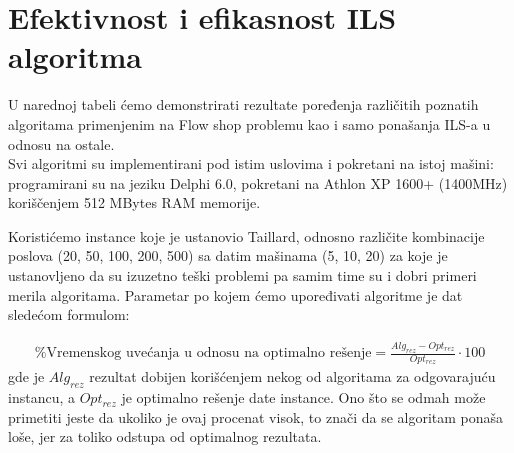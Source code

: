 \documentclass[a4paper]{article}
\begin{document}

\section{Efektivnost i efikasnost ILS algoritma}
U narednoj tabeli ćemo demonstrirati rezultate poređenja različitih poznatih algoritama primenjenim na Flow shop problemu kao i samo ponašanja ILS-a u odnosu na ostale. \\
Svi algoritmi su implementirani pod istim uslovima i pokretani na istoj mašini: programirani su na jeziku Delphi 6.0, pokretani na Athlon XP 1600+ (1400MHz) koriščenjem 512 MBytes RAM memorije. 

Koristićemo instance koje je ustanovio Taillard, odnosno različite kombinacije poslova (20, 50, 100, 200, 500) sa datim mašinama (5, 10, 20) za koje je ustanovljeno da su izuzetno teški problemi pa samim time su i dobri primeri merila algoritama. Parametar po kojem ćemo upoređivati algoritme je dat sledećom formulom:

\begin{gather*}
\textrm{\% Vremenskog uvećanja u odnosu na optimalno rešenje} = \frac{Alg_{rez} - Opt_{rez}}{Opt_{rez}} \cdot100
\end{gather*}
gde je $Alg_{rez}$ rezultat dobijen korišćenjem nekog od algoritama za odgovarajuću instancu, a $Opt_{rez}$ je optimalno rešenje date instance. Ono što se odmah može primetiti jeste da ukoliko je ovaj procenat visok, to znači da se algoritam ponaša loše, jer za toliko odstupa od optimalnog rezultata.
\\
\end{document}
